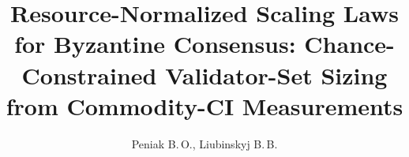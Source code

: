 \documentclass[12pt]{article}
\title[Resource-Normalized Scaling Laws for BFT Consensus]{Resource-Normalized
Scaling Laws for Byzantine Consensus: Chance-Constrained Validator-Set Sizing
from Commodity-CI Measurements}
\author[Peniak B.\,O.]{Peniak B.\,O., Liubinskyj B.\,B.}
\begin{document}
\maketitle











\maketitleUkr
\end{document}
